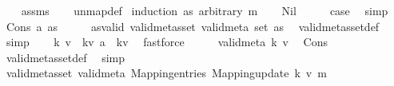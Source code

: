 \begin{isabellebody}
%
\isadelimproof
\ \ %
\endisadelimproof
%
\isatagproof
{}\isamarkupfalse%
\ assms\isanewline
\ \ \isamarkupfalse%
\ un{\isacharunderscore}{\kern0pt}map{\isacharunderscore}{\kern0pt}def\isanewline
{}\isamarkupfalse%
\ {\isacharparenleft}{\kern0pt}induction\ as\ arbitrary{\isacharcolon}{\kern0pt}\ m{\isacharparenright}{\kern0pt}\isanewline
\ \ \isamarkupfalse%
\ Nil\isanewline
\ \ \isamarkupfalse%
\ \isamarkupfalse%
\ {\isacharquery}{\kern0pt}case\ \isamarkupfalse%
\ simp\isanewline
{}\isamarkupfalse%
\isanewline
\ \ \isamarkupfalse%
\ {\isacharparenleft}{\kern0pt}Cons\ a\ as{\isacharparenright}{\kern0pt}\isanewline
\ \ \isamarkupfalse%
\ \isamarkupfalse%
\ as{\isacharunderscore}{\kern0pt}valid{\isacharcolon}{\kern0pt}\ {\isachardoublequoteopen}valid{\isacharunderscore}{\kern0pt}metas{\isacharunderscore}{\kern0pt}set\ valid{\isacharunderscore}{\kern0pt}meta\ {\isacharparenleft}{\kern0pt}set\ as{\isacharparenright}{\kern0pt}{\isachardoublequoteclose}\ \isamarkupfalse%
\ valid{\isacharunderscore}{\kern0pt}metas{\isacharunderscore}{\kern0pt}set{\isacharunderscore}{\kern0pt}def\ \isamarkupfalse%
\ simp\isanewline
\ \ \isamarkupfalse%
\ k\ v\ \ kv{\isacharcolon}{\kern0pt}\ {\isachardoublequoteopen}a\ {\isacharequal}{\kern0pt}\ {\isacharparenleft}{\kern0pt}k{\isacharcomma}{\kern0pt}v{\isacharparenright}{\kern0pt}{\isachardoublequoteclose}\ \isamarkupfalse%
\ fastforce\isanewline
\ \ \isamarkupfalse%
\ \isamarkupfalse%
\ {\isachardoublequoteopen}valid{\isacharunderscore}{\kern0pt}meta\ k\ v{\isachardoublequoteclose}\ \isamarkupfalse%
\ Cons{\isacharparenleft}{\kern0pt}{}{\isacharparenright}{\kern0pt}\ \isamarkupfalse%
\ valid{\isacharunderscore}{\kern0pt}metas{\isacharunderscore}{\kern0pt}set{\isacharunderscore}{\kern0pt}def\ \isamarkupfalse%
\ simp\isanewline
\ \ \isamarkupfalse%
\ \isamarkupfalse%
\ {\isachardoublequoteopen}valid{\isacharunderscore}{\kern0pt}metas{\isacharunderscore}{\kern0pt}set\ valid{\isacharunderscore}{\kern0pt}meta\ {\isacharparenleft}{\kern0pt}Mapping{\isachardot}{\kern0pt}entries\ {\isacharparenleft}{\kern0pt}Mapping{\isachardot}{\kern0pt}update\ k\ v\ m{\isacharparenright}{\kern0pt}{\isacharparenright}{\kern0pt}{\isachardoublequoteclose}\ \isamarkupfalse%

\end{isabellebody}
